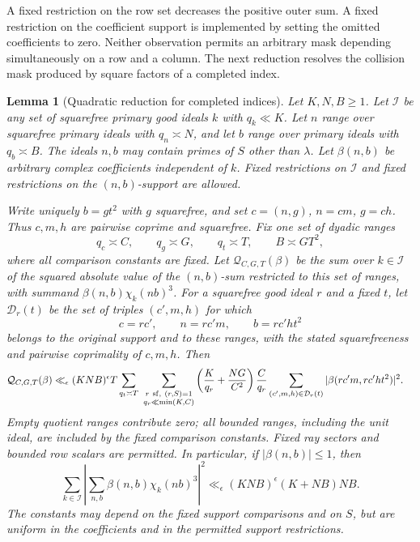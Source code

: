 \documentclass[11pt,a4paper]{article}
\numberwithin{equation}{section}
\numberwithin{figure}{section}
\newtheorem{lemma}[theorem]{Lemma}
\theoremstyle{definition}
\theoremstyle{remark}
\begin{document}
A fixed restriction on the row set decreases the positive outer sum.
A fixed restriction on the coefficient support is implemented by setting
the omitted coefficients to zero.  Neither observation permits an arbitrary
mask depending simultaneously on a row and a column.  The next reduction
resolves the collision mask produced by square factors of a completed index.

\begin{lemma}[Quadratic reduction for completed indices]
\label{lem:completed-quadratic-reduction}
Let $K,N,B\ge1$.  Let $\mathcal I$ be any set of squarefree primary good
ideals $k$ with $q_k\ll K$.  Let $n$ range over squarefree primary ideals
with $q_n\asymp N$, and let $b$ range over primary ideals with
$q_b\asymp B$.  The ideals $n,b$ may contain primes of $S$ other than
$\lambda$.  Let $\beta(n,b)$ be arbitrary complex coefficients independent
of $k$.  Fixed restrictions on $\mathcal I$ and fixed restrictions on the
$(n,b)$-support are allowed.

Write uniquely $b=gt^2$ with $g$ squarefree, and set
$c=(n,g)$, $n=cm$, $g=ch$.  Thus $c,m,h$ are pairwise coprime and
squarefree.  Fix one set of dyadic ranges
\[
 q_c\asymp C,\qquad q_g\asymp G,\qquad q_t\asymp T,
 \qquad B\asymp GT^2,
\]
where all comparison constants are fixed.  Let $\mathcal Q_{C,G,T}(\beta)$
be the sum over $k\in\mathcal I$ of the squared absolute value of the
$(n,b)$-sum restricted to this set of ranges, with summand
$\beta(n,b)\chi_k(nb)^3$.  For a squarefree good ideal $r$ and a fixed $t$,
let $\mathcal D_r(t)$ be the set of triples $(c',m,h)$ for which
\[
 c=rc',\qquad n=rc'm,\qquad b=rc'ht^2
\]
belongs to the original support and to these ranges, with the stated
squarefreeness and pairwise coprimality of $c,m,h$.  Then
\begin{equation}\label{eq:completed-quadratic-reduction}
 \begin{split}
 \mathcal Q_{C,G,T}(\beta)
 \ll_\epsilon{}&(KNB)^\epsilon T
 \sum_{q_t\asymp T}\ 
 \sum_{\substack{r\ {\rm sf},\ (r,S)=1\\q_r\ll\min(K,C)}}
 \left(\frac K{q_r}+\frac{NG}{C^2}\right)\frac C{q_r}
 \sum_{(c',m,h)\in\mathcal D_r(t)}
       |\beta(rc'm,rc'ht^2)|^2.
 \end{split}
\end{equation}
Empty quotient ranges contribute zero; all bounded ranges, including the
unit ideal, are included by the fixed comparison constants.  Fixed ray
sectors and bounded row scalars are permitted.  In particular, if
$|\beta(n,b)|\le1$, then
\begin{equation}\label{eq:completed-quadratic-norm}
 \sum_{k\in\mathcal I}
 \left|\sum_{n,b}\beta(n,b)\chi_k(nb)^3\right|^2
 \ll_\epsilon (KNB)^\epsilon(K+NB)NB.
\end{equation}
The constants may depend on the fixed support comparisons and on $S$, but
are uniform in the coefficients and in the permitted support restrictions.
\end{lemma}
\end{document}

